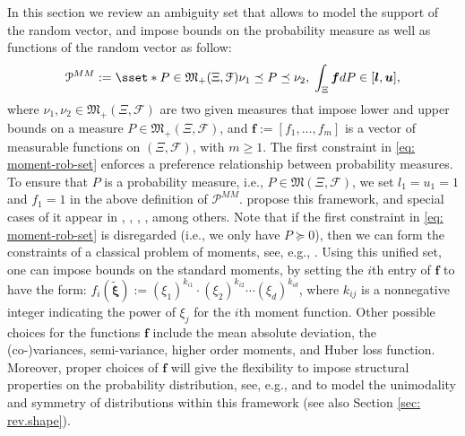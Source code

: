 \documentclass[final,onefignum,onetabnum]{class}
\newcommand{\bs}[1]{\boldsymbol{#1}} %
\newcommand{\Cs}[1]{\mathcal{#1}} %
\newcommand{\Fs}[1]{\mathfrak{#1}} %
\newcommand{\txi}{\tilde{\bs{\xi}}}
\newcommand{\measurespace}{\left( \Xi, \Cs{F} \right)}
\newcommand{\M}{\Fs{M}_{+}(\Xi,\Cs{F})}
\begin{document}
In this section we review an ambiguity set that allows to model the support of the random vector, and impose bounds on the probability measure  as well as functions of the random vector as follow:
\begin{equation}
\label{eq: moment-rob-set}
\Cs{P}^{MM}:=\sset*{P\in\M}{ \nu_1 \preceq P \preceq \nu_2,\; \int_{\Xi} \bs{f} d P \in [\bs{l}, \bs{u}]},
\end{equation}
where  $\nu_{1}, \nu_{2} \in\M$ are two given measures that impose lower and upper bounds on a measure $P \in \M$, and $\bs{f}:=[f_1,\ldots,f_m]$ is a vector of measurable functions on $\measurespace$, with $m \ge 1$.
The first constraint in \eqref{eq: moment-rob-set} enforces a preference relationship between probability measures. To ensure that $P$ is a probability measure, i.e., $P \in \Fs{M}\measurespace$, we set $l_1=u_1=1$ and $f_1=1$ in the above definition of $\Cs{P}^{MM}$. 
\citet{shapiro2004minmax} propose this framework, and special cases of it appear in \citet{popescu2005semidefinite}, \citet{bertsimas2005optimal}, \citet{perakis2008regret}, \citet{mehrotra2014semi}, among others. Note that if the first constraint in \eqref{eq: moment-rob-set} is disregarded (i.e., we only have $P \succeq 0$), then we can form the constraints of a classical problem of moments, see, e.g., \citet{landau1987moments}. Using this unified set, one can impose bounds on the standard moments, by setting the $i$th entry of $\bs{f}$ to have the form: $f_i(\txi):=(\xi_1)^{k_{i1}}\cdot (\xi_2)^{k_{i2}} \cdots (\xi_d)^{k_{id}}$, where $k_{ij}$ is a nonnegative integer indicating the power of $\xi_j$ for the $i$th moment function. Other possible choices for the 
functions $\bs{f}$ include the mean absolute deviation, the (co-)variances, semi-variance, higher order moments, and Huber
loss function. Moreover, proper choices of $\bs{f}$ will give the flexibility to impose structural properties on the probability distribution, see, e.g., \citet{popescu2005semidefinite} and \citet{perakis2008regret} to model the unimodality and  symmetry of distributions within this framework (see also Section \ref{sec: rev.shape}).
\end{document}
